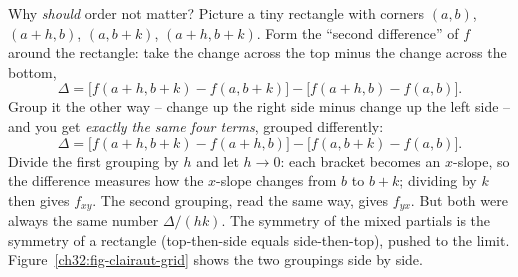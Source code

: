 \begin{intuitionbox}
Why \emph{should} order not matter? Picture a tiny rectangle with corners $(a,b)$,
$(a+h,b)$, $(a,b+k)$, $(a+h,b+k)$. Form the ``second difference'' of $f$ around the rectangle:
take the change across the top minus the change across the bottom,
\[
   \Delta = \big[f(a+h,b+k)-f(a,b+k)\big] - \big[f(a+h,b)-f(a,b)\big].
\]
Group it the other way -- change up the right side minus change up the left side -- and you get
\emph{exactly the same four terms}, grouped differently:
\[
   \Delta = \big[f(a+h,b+k)-f(a+h,b)\big] - \big[f(a,b+k)-f(a,b)\big].
\]
Divide the first grouping by $h$ and let $h\to 0$: each bracket becomes an $x$-slope, so the
difference measures how the $x$-slope changes from $b$ to $b+k$; dividing by $k$ then gives
$f_{xy}$. The second grouping, read the same way, gives $f_{yx}$. But both were always the same
number $\Delta/(hk)$. The symmetry of the mixed partials is
the symmetry of a rectangle (top-then-side equals side-then-top), pushed to the limit.
Figure~\ref{ch32:fig-clairaut-grid} shows the two groupings side by side.
\end{intuitionbox}

